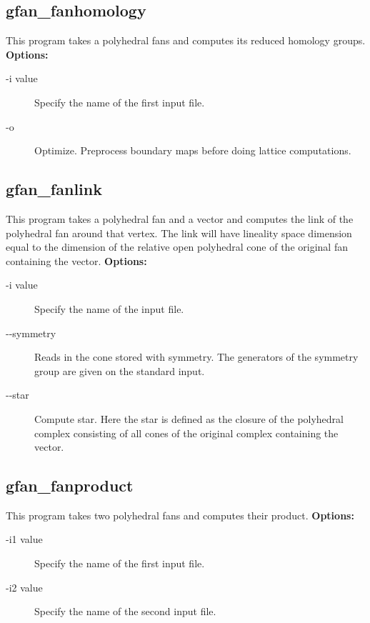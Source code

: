 {{{{{{{{{\subsection{gfan\_fanhomology}\label{applist:_fanhomology}
This program takes a polyhedral fans and computes its reduced homology groups.
\newline
{\bf Options:}
\begin{description}
\item[-i value]Specify the name of the first input file.\item[-o]Optimize. Preprocess boundary maps before doing lattice computations.\end{description}


{\subsection{gfan\_fanlink}\label{applist:_fanlink}
This program takes a polyhedral fan and a vector and computes the link of the polyhedral fan around that vertex. The link will have lineality space dimension equal to the dimension of the relative open polyhedral cone of the original fan containing the vector.
\newline
{\bf Options:}
\begin{description}
\item[-i value]Specify the name of the input file.\item[-\hspace{0.013cm}-symmetry]Reads in the cone stored with symmetry. The generators of the symmetry group are given on the standard input.
\item[-\hspace{0.013cm}-star]Compute star. Here the star is defined as the closure of the polyhedral complex consisting of all cones of the original complex containing the vector.\end{description}


{\subsection{gfan\_fanproduct}\label{applist:_fanproduct}
This program takes two polyhedral fans and computes their product.
\newline
{\bf Options:}
\begin{description}
\item[-i1 value]Specify the name of the first input file.\item[-i2 value]Specify the name of the second input file.\end{description}


}}}}}}}}}}}
